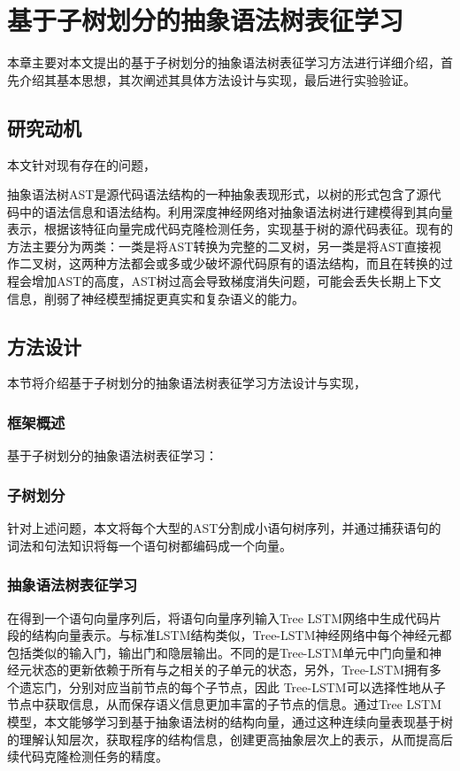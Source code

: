 \chapter{基于子树划分的抽象语法树表征学习}
本章主要对本文提出的基于子树划分的抽象语法树表征学习方法进行详细介绍，首先介绍其基本思想，其次阐述其具体方法设计与实现，最后进行实验验证。
\section{研究动机}
本文针对现有存在的问题，

抽象语法树AST是源代码语法结构的一种抽象表现形式，以树的形式包含了源代码中的语法信息和语法结构。利用深度神经网络对抽象语法树进行建模得到其向量表示，根据该特征向量完成代码克隆检测任务，实现基于树的源代码表征。现有的方法主要分为两类：一类是将AST转换为完整的二叉树，另一类是将AST直接视作二叉树，这两种方法都会或多或少破坏源代码原有的语法结构，而且在转换的过程会增加AST的高度，AST树过高会导致梯度消失问题，可能会丢失长期上下文信息，削弱了神经模型捕捉更真实和复杂语义的能力。
\section{方法设计}

本节将介绍基于子树划分的抽象语法树表征学习方法设计与实现， 

\subsection{框架概述}
基于子树划分的抽象语法树表征学习：

\subsection{子树划分}
针对上述问题，本文将每个大型的AST分割成小语句树序列，并通过捕获语句的词法和句法知识将每一个语句树都编码成一个向量。
\subsection{抽象语法树表征学习}
在得到一个语句向量序列后，将语句向量序列输入Tree LSTM网络中生成代码片段的结构向量表示。与标准LSTM结构类似，Tree-LSTM神经网络中每个神经元都包括类似的输入门，输出门和隐层输出。不同的是Tree-LSTM单元中门向量和神经元状态的更新依赖于所有与之相关的子单元的状态，另外，Tree-LSTM拥有多个遗忘门，分别对应当前节点的每个子节点，因此 Tree-LSTM可以选择性地从子节点中获取信息，从而保存语义信息更加丰富的子节点的信息。通过Tree LSTM模型，本文能够学习到基于抽象语法树的结构向量，通过这种连续向量表现基于树的理解认知层次，获取程序的结构信息，创建更高抽象层次上的表示，从而提高后续代码克隆检测任务的精度。
